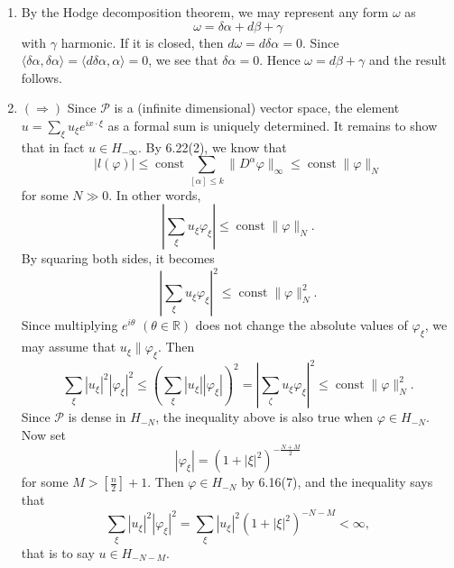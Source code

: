 \begin{enumerate}
(d) Adjoint: $D^{*}(u)=u^{\prime \prime}+\pi u$
\item By the Hodge decomposition theorem, we may represent any form $\omega$ as
\[\omega=\delta \alpha+d \beta+\gamma\]
with $\gamma$ harmonic. If it is closed, then $d \omega=d \delta \alpha=0$. 
Since $\langle\delta \alpha, \delta \alpha\rangle=\langle d \delta \alpha, \alpha\rangle=0$, 
we see that $\delta \alpha=0$. Hence $\omega=d \beta+\gamma$ and the result follows.
\item $(\Rightarrow)$ Since $\mathcal{P}$ is a (infinite dimensional) vector space, 
the element $u=\sum\limits_{\xi} u_{\xi} e^{i x \cdot \xi}$ as a formal sum is uniquely determined. 
It remains to show that in fact $u \in H_{-\infty}$. By 6.22(2), we know that
\[|l(\varphi)| \leq \operatorname{const} \sum_{[\alpha] \leq k}\|D^{\alpha} \varphi\|_{\infty} \leq \operatorname{const} \|\varphi\|_{N}\]
for some $N \gg 0$. In other words,
\[\left|\sum_{\xi} u_{\xi} \varphi_{\xi}\right| \leq \operatorname{const}\|\varphi\|_{N}.\]
By squaring both sides, it becomes
\[\left|\sum_{\xi} u_{\xi} \varphi_{\xi}\right|^{2} \leq \operatorname{const} \|\varphi\|_{N}^{2}.\]
Since multiplying $e^{i \theta}$ $(\theta \in \mathbb{R})$ does not change the absolute values of $\varphi_{\xi}$, 
we may assume that $u_{\xi} \| \varphi_{\xi}$. Then
\[\sum_{\xi}|u_{\xi}|^{2}|\varphi_{\xi}|^{2} \leq \left(\sum_{\xi}|u_{\xi}||\varphi_{\xi}|\right)^{2}
=\left|\sum_{\zeta} u_{\xi} \varphi_{\xi}\right|^{2} \leq \operatorname{const} \|\varphi\|_{N}^{2}.\]
Since $\mathcal{P}$ is dense in $H_{-N}$, 
the inequality above is also true when $\varphi \in H_{-N}$. Now set
\[|\varphi_{\xi}|=(1+|\xi|^{2})^{-\frac{N+M}{2}}\]
for some $M>\left[\frac{n}{2}\right]+1$. 
Then $\varphi \in H_{-N}$ by 6.16(7), and the inequality says that
\[\sum_{\xi}|u_{\xi}|^{2}|\varphi_{\xi}|^{2}
=\sum_{\xi}|u_{\xi}|^{2}(1+|\xi|^{2})^{-N-M}<\infty,\]
that is to say $u \in H_{-N-M}$.


\end{enumerate}
